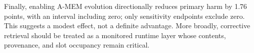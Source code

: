 Finally, enabling A-MEM evolution directionally reduces primary harm by 1.76
points, with an interval including zero; only sensitivity endpoints exclude
zero. This suggests a modest effect, not a definite advantage. More broadly,
corrective retrieval should be treated as a monitored runtime layer whose
contents, provenance, and slot occupancy remain critical.
